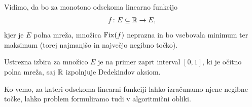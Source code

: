 Vidimo, da bo za monotono odsekoma linearno funkcijo 
\[
  f \colon E \subseteq \mathbb{R} \to E,
\]
kjer je \(E\) polna mreža, množica \(\operatorname{Fix}(f)\) neprazna in bo vsebovala minimum ter maksimum (torej najmanjšo in največjo negibno točko).  

Ustrezna izbira za množico \(E\) je na primer zaprt interval \([0,1]\), ki je očitno polna mreža, saj \(\mathbb{R}\) izpolnjuje Dedekindov aksiom.

Ko vemo, za kateri odsekoma linearni funkciji lahko izračunamo njene negibne točke, lahko problem formuliramo tudi v algoritmični obliki.